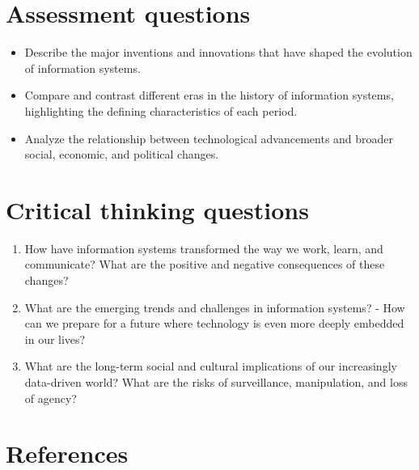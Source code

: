 \documentclass[
  letterpaper,
  DIV=11,
  numbers=noendperiod]{scrreprt}
\providecommand{\tightlist}{%
  \setlength{\itemsep}{0pt}\setlength{\parskip}{0pt}}\usepackage{longtable,booktabs,array}
\begin{document}
\section{Assessment questions}\label{assessment-questions}

\begin{itemize}
\tightlist
\item
  Describe the major inventions and innovations that have shaped the
  evolution of information systems.
\item
  Compare and contrast different eras in the history of information
  systems, highlighting the defining characteristics of each period.
\item
  Analyze the relationship between technological advancements and
  broader social, economic, and political changes.
\end{itemize}

\section{Critical thinking questions}\label{critical-thinking-questions}

\begin{enumerate}
\def\labelenumi{\arabic{enumi}.}
\tightlist
\item
  How have information systems transformed the way we work, learn, and
  communicate? What are the positive and negative consequences of these
  changes?
\item
  What are the emerging trends and challenges in information systems? -
  How can we prepare for a future where technology is even more deeply
  embedded in our lives?
\item
  What are the long-term social and cultural implications of our
  increasingly data-driven world? What are the risks of surveillance,
  manipulation, and loss of agency?
\end{enumerate}

\section{References}\label{references}
\end{document}
